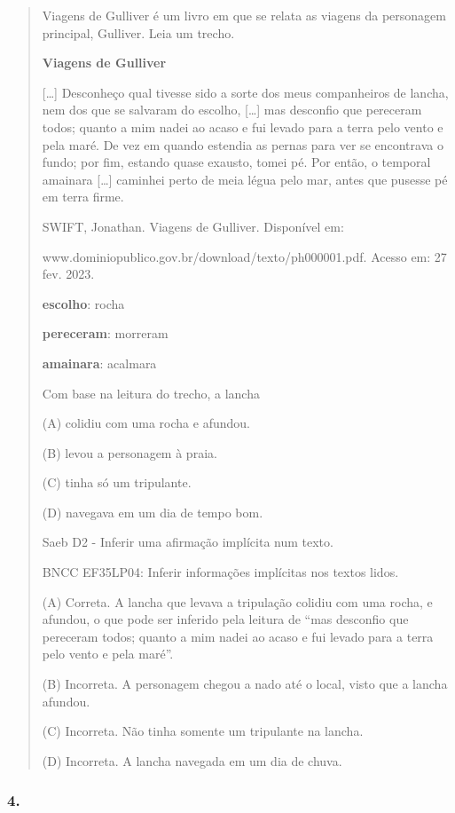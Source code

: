 \begin{quote}
Viagens de Gulliver é um livro em que se relata as viagens da personagem
principal, Gulliver. Leia um trecho.

\textbf{Viagens de Gulliver}

{[}\ldots{}{]} Desconheço qual tivesse sido a sorte dos meus
companheiros de lancha, nem dos que se salvaram do escolho,
{[}\ldots{}{]} mas desconfio que pereceram todos; quanto a mim nadei ao
acaso e fui levado para a terra pelo vento e pela maré. De vez em quando
estendia as pernas para ver se encontrava o fundo; por fim, estando
quase exausto, tomei pé. Por então, o temporal amainara {[}\ldots{}{]}
caminhei perto de meia légua pelo mar, antes que pusesse pé em terra
firme.

SWIFT, Jonathan. Viagens de Gulliver. Disponível em:

www.dominiopublico.gov.br/download/texto/ph000001.pdf. Acesso em: 27
fev. 2023.

\textbf{escolho}: rocha

\textbf{pereceram}: morreram

\textbf{amainara}: acalmara

Com base na leitura do trecho, a lancha

(A) colidiu com uma rocha e afundou.

(B) levou a personagem à praia.

(C) tinha só um tripulante.

(D) navegava em um dia de tempo bom.

Saeb D2 - Inferir uma afirmação implícita num texto.

BNCC EF35LP04: Inferir informações implícitas nos textos lidos.

(A) Correta. A lancha que levava a tripulação colidiu com uma rocha, e
afundou, o que pode ser inferido pela leitura de ``mas desconfio que
pereceram todos; quanto a mim nadei ao acaso e fui levado para a terra
pelo vento e pela maré''.

(B) Incorreta. A personagem chegou a nado até o local, visto que a
lancha afundou.

(C) Incorreta. Não tinha somente um tripulante na lancha.

(D) Incorreta. A lancha navegada em um dia de chuva.
\end{quote}

\subsubsection{4. }\label{section-83}

